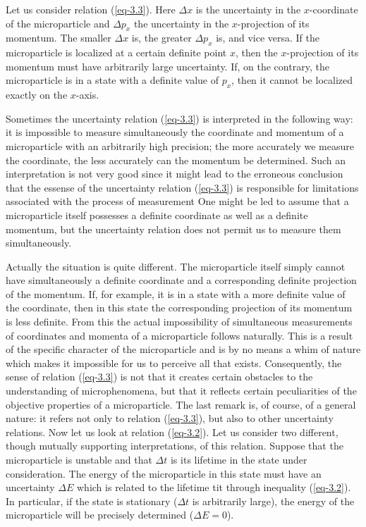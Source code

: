 \documentclass[a4paper,sfsidenotes,colorlinks=true]{tufte-book}
\numberwithin{equation}{section}
\numberwithin{figure}{section}
\begin{document}
Let us consider 
relation (\ref{eq-3.3}). Here $\Delta x$ is the uncertainty in the
$x$-coordinate of the microparticle and $\Delta p_{x}$ the uncertainty
in the $x$-projection of its momentum. The smaller $\Delta x$ is, the
greater $\Delta p_{x}$ is, and vice versa. If the microparticle is
localized at a certain definite point $x$, then the $x$-projection of its
momentum must have arbitrarily large uncertainty. If, on the
contrary, the microparticle is in a state with a definite value of
$p_{x}$, then it cannot be localized exactly on the $x$-axis.

Sometimes the uncertainty relation (\ref{eq-3.3}) is interpreted in
the following way: it is impossible to measure simultaneously the
coordinate and momentum of a microparticle with an arbitrarily high
precision; the more accurately we measure the coordinate, the less
accurately can the momentum be determined. Such an interpretation is
not very good since it might lead to the erroneous conclusion that the
essense of the uncertainty relation (\ref{eq-3.3}) is responsible for
limitations associated with the process of measurement One might be
led to assume that a microparticle itself possesses a definite
coordinate as well as a definite momentum, but the uncertainty
relation does not permit us to measure them simultaneously.  

Actually the situation is quite different. The microparticle itself
simply cannot have simultaneously a definite coordinate and a
corresponding definite projection of the momentum. If, for example, it
is in a state with a more definite value of the coordinate, then in
this state the corresponding projection of its momentum is less
definite. From this the actual impossibility of simultaneous
measurements of coordinates and momenta of a microparticle follows
naturally. This is a result of the specific character of the
microparticle and is by no means a whim of nature which makes it
impossible for us to perceive all that exists. Consequently, the sense
of relation (\ref{eq-3.3}) is not that it creates certain obstacles to
the understanding of microphenomena, but that it reflects certain
peculiarities of the objective properties of a microparticle. The last
remark is, of course, of a general nature: it refers not only to
relation (\ref{eq-3.3}), but also to other uncertainty relations. Now
let us look at relation (\ref{eq-3.2}). Let us consider two different, though
mutually supporting interpretations, of this relation. Suppose that
the microparticle is unstable and that $\Delta t$ is its lifetime in the
state under consideration. The energy of the microparticle in this
state must have an uncertainty $\Delta E$ which is related to the lifetime
tit through inequality (\ref{eq-3.2}). In particular, if the state is
stationary ($\Delta t$ is arbitrarily large), the energy of the microparticle
will be precisely determined ($\Delta E = 0$).  
\end{document}
